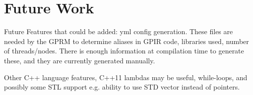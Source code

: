 \chapter{Future Work}

Future Features that could be added:
    yml config generation.
    These files are needed by the GPRM to determine aliases in GPIR code, libraries used,
    number of threads/nodes. There is enough information at compilation time to generate these,
    and they are currently generated manually. 

    Other C++ language features, C++11 lambdas may be useful,
    while-loops, and possibly some STL support e.g. ability to use STD vector instead of pointers.


